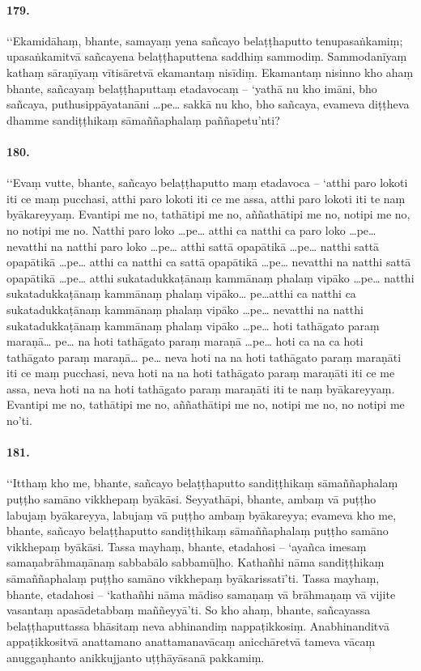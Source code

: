 \paragraph{179.} ‘‘Ekamidāhaṃ, bhante, samayaṃ yena sañcayo belaṭṭhaputto tenupasaṅkamiṃ; upasaṅkamitvā sañcayena belaṭṭhaputtena saddhiṃ sammodiṃ. Sammodanīyaṃ kathaṃ sāraṇīyaṃ vītisāretvā ekamantaṃ nisīdiṃ. Ekamantaṃ nisinno kho ahaṃ bhante, sañcayaṃ belaṭṭhaputtaṃ etadavocaṃ – ‘yathā nu kho imāni, bho sañcaya, puthusippāyatanāni …pe… sakkā nu kho, bho sañcaya, evameva diṭṭheva dhamme sandiṭṭhikaṃ sāmaññaphalaṃ paññapetu’nti?

\paragraph{180.} ‘‘Evaṃ vutte, bhante, sañcayo belaṭṭhaputto maṃ etadavoca – ‘atthi paro lokoti iti ce maṃ pucchasi, atthi paro lokoti iti ce me assa, atthi paro lokoti iti te naṃ byākareyyaṃ. Evantipi me no, tathātipi me no, aññathātipi me no, notipi me no, no notipi me no. Natthi paro loko …pe… atthi ca natthi ca paro loko …pe… nevatthi na natthi paro loko …pe… atthi sattā opapātikā …pe… natthi sattā opapātikā …pe… atthi ca natthi ca sattā opapātikā …pe… nevatthi na natthi sattā opapātikā …pe… atthi sukatadukkaṭānaṃ kammānaṃ phalaṃ vipāko …pe… natthi sukatadukkaṭānaṃ kammānaṃ phalaṃ vipāko… pe…atthi ca natthi ca sukatadukkaṭānaṃ kammānaṃ phalaṃ vipāko …pe… nevatthi na natthi sukatadukkaṭānaṃ kammānaṃ phalaṃ vipāko …pe… hoti tathāgato paraṃ maraṇā… pe… na hoti tathāgato paraṃ maraṇā …pe… hoti ca na ca hoti tathāgato paraṃ maraṇā… pe… neva hoti na na hoti tathāgato paraṃ maraṇāti iti ce maṃ pucchasi, neva hoti na na hoti tathāgato paraṃ maraṇāti iti ce me assa, neva hoti na na hoti tathāgato paraṃ maraṇāti iti te naṃ byākareyyaṃ. Evantipi me no, tathātipi me no, aññathātipi me no, notipi me no, no notipi me no’ti.

\paragraph{181.} ‘‘Itthaṃ kho me, bhante, sañcayo belaṭṭhaputto sandiṭṭhikaṃ sāmaññaphalaṃ puṭṭho samāno vikkhepaṃ byākāsi. Seyyathāpi, bhante, ambaṃ vā puṭṭho labujaṃ byākareyya, labujaṃ vā puṭṭho ambaṃ byākareyya; evameva kho me, bhante, sañcayo belaṭṭhaputto sandiṭṭhikaṃ sāmaññaphalaṃ puṭṭho samāno vikkhepaṃ byākāsi. Tassa mayhaṃ, bhante, etadahosi – ‘ayañca imesaṃ samaṇabrāhmaṇānaṃ sabbabālo sabbamūḷho. Kathañhi nāma sandiṭṭhikaṃ sāmaññaphalaṃ puṭṭho samāno vikkhepaṃ byākarissatī’ti. Tassa mayhaṃ, bhante, etadahosi – ‘kathañhi nāma mādiso samaṇaṃ vā brāhmaṇaṃ vā vijite vasantaṃ apasādetabbaṃ maññeyyā’ti. So kho ahaṃ, bhante, sañcayassa belaṭṭhaputtassa bhāsitaṃ neva abhinandiṃ nappaṭikkosiṃ. Anabhinanditvā appaṭikkositvā anattamano anattamanavācaṃ anicchāretvā tameva vācaṃ anuggaṇhanto anikkujjanto uṭṭhāyāsanā pakkamiṃ.


